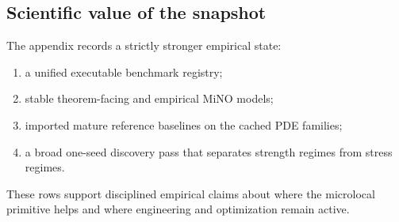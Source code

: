 \subsection{Scientific value of the snapshot}

The appendix records a strictly stronger empirical state:
\begin{enumerate}
\item a unified executable benchmark registry;
\item stable theorem-facing and empirical MiNO models;
\item imported mature reference baselines on the cached PDE families;
\item a broad one-seed discovery pass that separates strength regimes from stress regimes.
\end{enumerate}

These rows support disciplined empirical claims about where the microlocal primitive helps and where engineering and optimization remain active.

